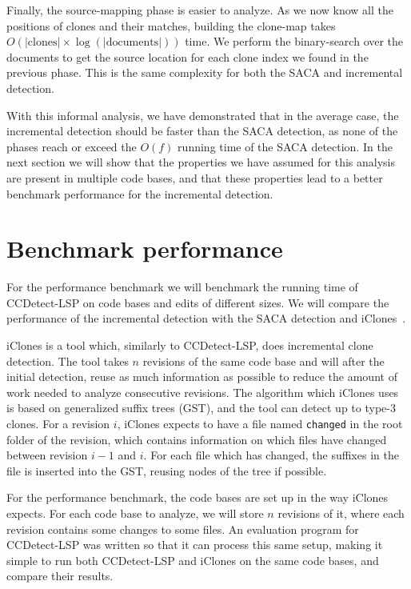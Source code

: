 Finally, the source-mapping phase is easier to analyze. As we now know all the positions
of clones and their matches, building the clone-map takes $O(\vert\text{clones}\vert
\times \log(\vert\text{documents}\vert))$ time. We perform the binary-search over the
documents to get the source location for each clone index we found in the previous phase.
This is the same complexity for both the SACA and incremental detection.

With this informal analysis, we have demonstrated that in the average case, the
incremental detection should be faster than the SACA detection, as none of the phases
reach or exceed the $O(f)$ running time of the SACA detection. In the next section we will
show that the properties we have assumed for this analysis are present in multiple code
bases, and that these properties lead to a better benchmark performance for the
incremental detection.

\section{Benchmark performance}

For the performance benchmark we will benchmark the running time of CCDetect-LSP on code
bases and edits of different sizes. We will compare the performance of the incremental
detection with the SACA detection and iClones~\cite{GodeIncrementalCloneDetection}.

iClones is a tool which, similarly to CCDetect-LSP, does incremental clone detection. The
tool takes $n$ revisions of the same code base and will after the initial detection, reuse
as much information as possible to reduce the amount of work needed to analyze consecutive
revisions. The algorithm which iClones uses is based on generalized suffix trees (GST),
and the tool can detect up to type-3 clones. For a revision $i$, iClones expects to have a
file named \verb|changed| in the root folder of the revision, which contains information
on which files have changed between revision $i - 1$ and $i$. For each file which has
changed, the suffixes in the file is inserted into the GST, reusing nodes of the tree if
possible.

For the performance benchmark, the code bases are set up in the way iClones expects. For
each code base to analyze, we will store $n$ revisions of it, where each revision contains
some changes to some files. An evaluation program for CCDetect-LSP was written so that it
can process this same setup, making it simple to run both CCDetect-LSP and iClones on the
same code bases, and compare their results.

